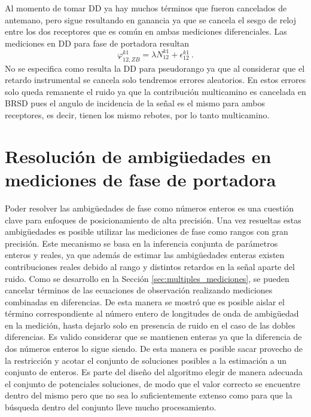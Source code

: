 \documentclass[a4paper,12pt,oneside,onecolumn,final,openright]{book}%
\begin{document}
	Al momento de tomar DD ya hay muchos términos que fueron cancelados de antemano, pero sigue resultando en ganancia ya que se cancela el sesgo de reloj entre los dos receptores que es común en ambas mediciones diferenciales. Las mediciones en DD para fase de portadora resultan
\begin{equation}
	\varphi_{12,ZB}^{k1} = \lambda N_{12}^{k1} + \epsilon_{12}^{k1} \ .
\end{equation}
	No se especifica como resulta la DD para pseudorango ya que al considerar que el retardo instrumental se cancela solo tendremos errores aleatorios. En estos errores solo queda remanente el ruido ya que la contribución multicamino es cancelada en BRSD pues el angulo de incidencia de la señal es el mismo para ambos receptores, es decir, tienen los mismo rebotes, por lo tanto multicamino.
\section{Resolución de ambigüedades en mediciones de fase de portadora}\label{sec:amb_res}
	Poder resolver las ambigüedades de fase como números enteros es una cuestión clave para enfoques de posicionamiento de alta precisión. Una vez resueltas estas ambigüedades es posible utilizar las mediciones de fase como rangos con gran precisión. Este mecanismo se basa en la inferencia conjunta de parámetros enteros y reales, ya que además de estimar las ambigüedades enteras existen contribuciones reales debido al rango y distintos retardos en la señal aparte del ruido. Como se desarrollo en la Sección \ref{sec:multiples_mediciones}, se pueden cancelar términos de las ecuaciones de observación realizando mediciones combinadas en diferencias. De esta manera se mostró que es posible aislar el término correspondiente al número entero de longitudes de onda de ambigüedad en la medición, hasta dejarlo solo en presencia de ruido en el caso de las dobles diferencias. Es valido considerar que se mantienen enteras ya que la diferencia de dos números enteros lo sigue siendo. De esta manera es posible sacar provecho de la restricción y acotar el conjunto de soluciones posibles a la estimación a un conjunto de enteros. Es parte del diseño del algoritmo elegir de manera adecuada el conjunto de potenciales soluciones, de modo que el valor correcto se encuentre dentro del mismo pero que no sea lo suficientemente extenso como para que la búsqueda dentro del conjunto lleve mucho procesamiento.
	
\end{document}
